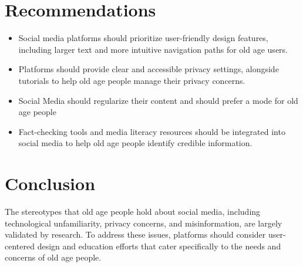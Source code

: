\documentclass[a4paper,12pt]{article}
\begin{document}
\section{Recommendations}
\begin{itemize}
    \item Social media platforms should prioritize user-friendly design features, including larger text and more intuitive navigation paths for old age users.
    \item Platforms should provide clear and accessible privacy settings, alongside tutorials to help old age people manage their privacy concerns.
    \item Social Media should regularize their content and should prefer a mode for old age people
    \item Fact-checking tools and media literacy resources should be integrated into social media to help old age people identify credible information.
\end{itemize}

\section{Conclusion}
The stereotypes that old age people hold about social media, including technological unfamiliarity, privacy concerns, and misinformation, are largely validated by research. To address these issues, platforms should consider user-centered design and education efforts that cater specifically to the needs and concerns of old age people.
\end{document}
